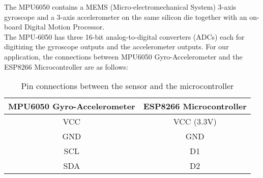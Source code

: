 \documentclass[./main.tex]{subfiles}
\begin{document}
The MPU6050 contains a MEMS (Micro-electromechanical System) 3-axis gyroscope and a 3-axis accelerometer on the same silicon die together with an on-board Digital Motion Processor. \\ The MPU-6050 has three 16-bit analog-to-digital converters (ADCs) each for digitizing the gyroscope outputs and the accelerometer outputs.
For our application, the connections between MPU6050 Gyro-Accelerometer and the ESP8266 Microcontroller are as follows:
\begin{table}[H]
    \centering
    \begin{tabular}{|c|c|}
    \hline
    MPU6050 Gyro-Accelerometer & ESP8266 Microcontroller \\
    \hline
    VCC & VCC (3.3V) \\
    GND & GND \\
    SCL & D1 \\
    SDA & D2 \\
    \hline
\end{tabular}
    \caption{Pin connections between the sensor and the microcontroller}
    \label{tab:pin}
\end{table}
\end{document}
